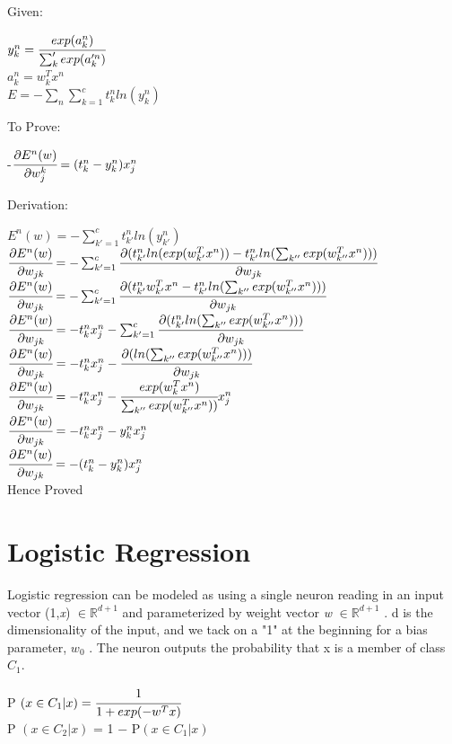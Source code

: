 \documentclass{article} %
\begin{document}
Given:
\begin{center}
	$y_k^n = \cfrac{exp(a_{k}^n)}{\sum_k' exp(a_k'^n)}$\\
    \hfill\break
$a_{k}^n = w_k^T x^n$\\
\hfill\break
$E = −\sum_n \sum_{k=1}^{c} t^n_k ln(y_k^n)$
\end{center}
To Prove:
\begin{center}
    -$\cfrac{\partial E^n(w)}{\partial w_j^k} = (t^n_k-y^n_k)x^n_j $\\
    \hfill\break
\end{center}
Derivation:
\begin{center}
$E^n(w) = -\sum_{k'=1}^{c} t^n_{k'} ln(y_{k'}^n)$\\
\hfill\break
\hfill\break
$\cfrac{\partial E^n(w)}{\partial w_{jk}} = -\sum_{k'=1}^{c}\cfrac{\partial(t^n_{k'}ln(exp(w_{k'}^Tx^n))-t^n_{k'}ln(\sum_{k''}exp(w_{k''}^Tx^n)))}{\partial w_{jk}}$\\
	\hfill\break
    \hfill\break
$\cfrac{\partial E^n(w)}{\partial w_{jk}} = -\sum_{k'=1}^{c}\cfrac{\partial(t^n_{k'}w_{k'}^Tx^n-t^n_{k'}ln(\sum_{k''}exp(w_{k''}^Tx^n)))}{\partial w_{jk}}$\\
    \hfill\break
    \hfill\break
$\cfrac{\partial E^n(w)}{\partial w_{jk}} = -t^n_kx^n_j-\sum_{k'=1}^{c}\cfrac{\partial (t^n_{k'}ln(\sum_{k''}exp(w_{k''}^Tx^n)))}{\partial w_{jk}}$\\
    \hfill\break
    \hfill\break
$\cfrac{\partial E^n(w)}{\partial w_{jk}} = -t^n_kx^n_j-\cfrac{\partial (ln(\sum_{k''}exp(w_{k''}^Tx^n)))}{\partial w_{jk}}$\\
    \hfill\break
    \hfill\break
$\cfrac{\partial E^n(w)}{\partial w_{jk}} = -t^n_kx^n_j-\cfrac{exp(w_k^Tx^n)}{\sum_{k''}exp(w_{k''}^Tx^n))}x^n_j$\\
    \hfill\break
    \hfill\break
$\cfrac{\partial E^n(w)}{\partial w_{jk}} = -t^n_kx^n_j-y_k^nx^n_j$\\
    \hfill\break
    \hfill\break
$\cfrac{\partial E^n(w)}{\partial w_{jk}} = -(t^n_k-y_k^n)x^n_j$\\
    \hfill\break
    Hence Proved 

\end{center}

\section{Logistic Regression}
Logistic regression can be modeled as using a single neuron reading in an input vector (1,{\sl x}) $\in \mathbb{R}^{d+1}$ and parameterized by weight vector {\sl w} $\in \mathbb{R}^{d+1}$ . d is the dimensionality of the input, and we tack on a "1" at the beginning for a bias parameter, $w_0$ . The neuron outputs the probability that x is a member of class $C_1$.\\
\begin{center}
P $(x \in C_1 |x) = \cfrac{1}{1+exp(-w^T x)}$\\
\hfill\break
\hfill\break
P $(x \in C_2 |x)$ = 1 − P$(x \in C_1 |x)$\\
\hfill\break
\end{center}
\end{document}
